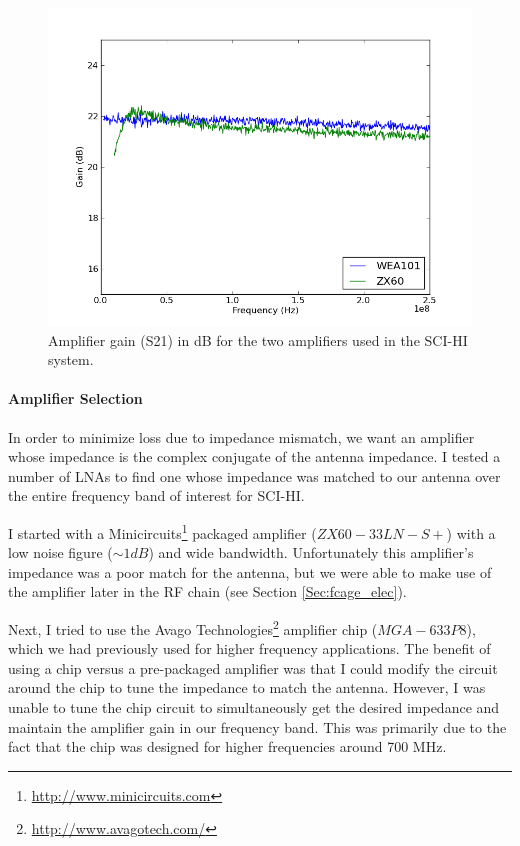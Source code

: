 \begin{figure}[htb]
\begin{center}
\includegraphics[width=0.9\linewidth]{SCIHI_system/figures/amp_Gain_dB.png}
\caption{Amplifier gain (S21) in dB for the two amplifiers used in the SCI-HI system. }
\label{Fig:amp_gain}
\end{center}
\end{figure}

\paragraph{Amplifier Selection}

In order to minimize loss due to impedance mismatch, we want an amplifier whose impedance is the complex conjugate of the antenna impedance. I tested a number of LNAs to find one whose impedance was matched to our antenna over the entire frequency band of interest for SCI-HI. 

I started with a Minicircuits\footnote{\url{http://www.minicircuits.com}} packaged amplifier ($ZX60 - 33 LN - S+$) with a low noise figure ($\sim 1 dB$) and wide bandwidth. Unfortunately this amplifier's impedance was a poor match for the antenna, but we were able to make use of the amplifier later in the RF chain (see Section \ref{Sec:fcage_elec}). 

Next, I tried to use the Avago Technologies\footnote{\url{http://www.avagotech.com/}} amplifier chip ($MGA-633P8$), which we had previously used for higher frequency applications. The benefit of using a chip versus a pre-packaged amplifier was that I could modify the circuit around the chip to tune the impedance to match the antenna. However, I was unable to tune the chip circuit to simultaneously get the desired impedance and maintain the amplifier gain in our frequency band. This was primarily due to the fact that the chip was designed for higher frequencies around 700 MHz. 

